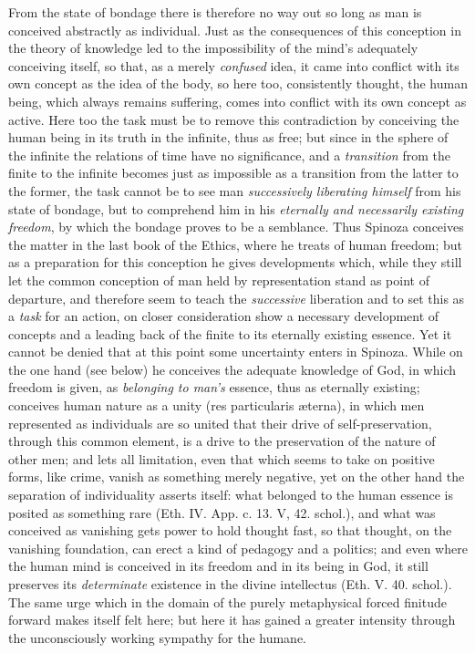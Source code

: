 \documentclass[12pt,a4paper,openany]{book}
\newcommand{\opage}[1]{\marginnote{\footnotesize\textit{[#1]}}}
\begin{document}
From the state of bondage there is therefore no way out so
long as man is conceived abstractly as individual. Just as
the consequences of this conception in the theory of knowledge
led to the impossibility of the mind's adequately conceiving
itself, so that, as a merely \emph{confused} idea, it came into
conflict with its own concept as the idea of the body, so
here too, consistently thought, the human
being, which always remains suffering, comes into conflict with its own concept
as active. Here too the task must be to remove this
contradiction by conceiving the human being in its
truth in the infinite, thus as free; but since in the sphere of the
infinite the relations of time have no significance, and
a \emph{transition} from the finite to the infinite becomes
just as impossible as a transition from the latter to the former, the
task cannot be to see man \emph{successively liberating
himself} from his state of bondage, but to comprehend him in his
\emph{eternally and necessarily existing freedom}, by which the
bondage proves to be a semblance. Thus Spinoza
conceives the matter in the last book of the Ethics, where he treats of
human freedom; but as a preparation for this
conception he gives developments which, while they still let
the common conception of man held by representation stand
as point of departure, and therefore seem to teach the \emph{successive}
liberation and to set this as a \emph{task} for an
action, on closer consideration show a necessary
development of concepts and a leading back of the finite to its
eternally existing essence. Yet it cannot be denied that
at this point some uncertainty enters in
Spinoza. While on the one hand (see below)
he conceives the adequate knowledge of God, in which freedom
is given, as \emph{belonging to man's}
\opage{122}\setcounter{footnote}{0}essence, thus as eternally existing; conceives human
nature as a unity (res particularis æterna), in which
men represented as individuals are so united
that their drive of self-preservation, through this common element, is a
drive to the preservation of the nature of other men; and lets
all limitation, even that which seems to take on positive
forms, like crime, vanish as something merely negative,
yet on the other hand the separation of individuality
asserts itself: what belonged to the human essence
is posited as something rare (Eth. IV. App. c. 13. V, 42.
schol.), and what was conceived as vanishing gets
power to hold thought fast, so that thought, on the vanishing
foundation, can erect a kind of pedagogy and a
politics; and even where the human mind is conceived in
its freedom and in its being in God, it still preserves its
\emph{determinate} existence in the divine intellectus (Eth.
V. 40. schol.). The same urge which in the domain of the purely
metaphysical forced finitude forward makes itself felt
here; but here it has gained a greater intensity through
the unconsciously working sympathy for the humane.
\end{document}
